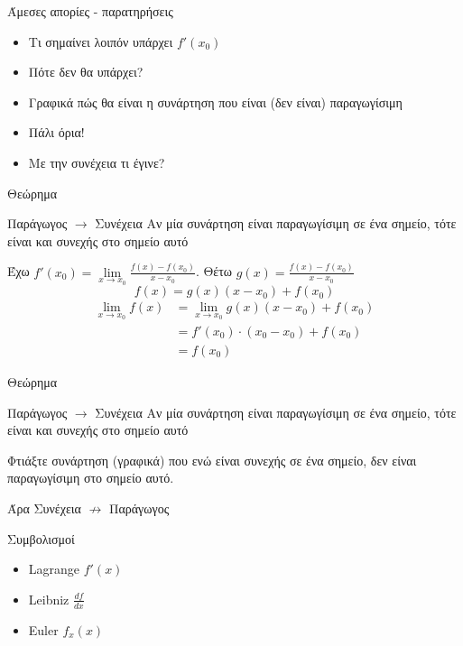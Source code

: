 \documentclass[greek]{beamer}
\begin{document}
\begin{frame}{Άμεσες απορίες - παρατηρήσεις}
 \begin{itemize}
  \item<1-> Τι σημαίνει λοιπόν υπάρχει $f'(x_0)$
  \item<2-> Πότε δεν θα υπάρχει?
  \item<3-> Γραφικά πώς θα είναι η συνάρτηση που είναι (δεν είναι) παραγωγίσιμη
  \item<4-> Πάλι όρια!
  \item<5-> Με την συνέχεια τι έγινε?
 \end{itemize}
\end{frame}

\begin{frame}{Θεώρημα}
 \begin{block}{Παράγωγος $\to$ Συνέχεια}
  Αν μία συνάρτηση είναι παραγωγίσιμη σε ένα σημείο, τότε είναι και συνεχής στο σημείο αυτό
 \end{block}
 Έχω $f'(x_0)=\lim\limits_{x \to x_0}{ \frac{f(x)-f(x_0)}{x-x_0} }$. Θέτω $g(x)=\frac{f(x)-f(x_0)}{x-x_0}$
 $$f(x)=g(x)(x-x_0)+f(x_0)$$
 \begin{align*}
   \lim\limits_{x \to x_0}{ f(x) }&=\lim\limits_{x \to x_0}{ g(x)(x-x_0)+f(x_0) } \\
   &=f'(x_0)\cdot (x_0-x_0)+f(x_0) \\
   &=f(x_0)
 \end{align*}
\end{frame}

\begin{frame}{Θεώρημα}
 \begin{block}{Παράγωγος $\to$ Συνέχεια}
  Αν μία συνάρτηση είναι παραγωγίσιμη σε ένα σημείο, τότε είναι και συνεχής στο σημείο αυτό
 \end{block}
  Φτιάξτε συνάρτηση (γραφικά) που ενώ είναι συνεχής σε ένα σημείο, δεν είναι παραγωγίσιμη στο σημείο αυτό.

  Άρα Συνέχεια $\nrightarrow$ Παράγωγος
\end{frame}

\begin{frame}{Συμβολισμοί}
 \begin{itemize}
  \item<1-> Lagrange $f'(x)$
  \item<2-> Leibniz $\frac{df}{dx}$
  \item<3-> Euler $f_x(x)$
 \end{itemize}
\end{frame}
\end{document}
